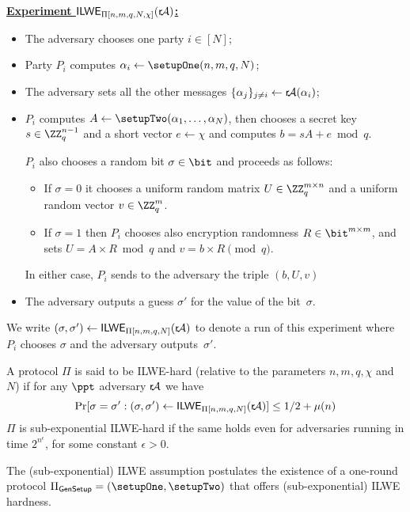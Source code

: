 \smallskip\noindent
\underline{\textbf{Experiment $\mathsf{ILWE}_{\Pi[n,m,q,N,\chi]}({\sf r}\!{\cal A})$:}}
\vspace{-1ex}
\begin{itemize}
\item
  The adversary chooses one party $i\in [N]$;
\item
  Party $P_i$ computes $\alpha_i\gets\setupOne(n,m,q,N)$;
\item
  The adversary sets all the other messages $\{\alpha_j\}_{j\ne i}\gets {\sf r}\!{\cal A}(\alpha_i)$;
\item
  $P_i$ computes $A\gets \setupTwo(\alpha_1,\ldots,\alpha_N)$, then chooses a secret key $s\in \ZZ_q^{n-1}$ and a short vector $e\gets\chi$ and computes $b=sA+e\bmod{q}$.

  $P_i$ also chooses a random bit $\sigma\in\bit$ and proceeds as follows:
  \begin{itemize}
  \item If $\sigma=0$ it chooses a uniform random matrix $U\in\ZZ_q^{m\times n}$ and a uniform random vector $v\in\ZZ_q^m$.

  \item If $\sigma=1$ then $P_i$ chooses also encryption randomness $R\in\bit^{m\times m}$, and sets $U = A\times R \bmod{q}$ and $v=b\times R \pmod{q}$.
  \end{itemize}
  In either case, $P_i$ sends to the adversary the triple $(b,U,v)$ 
\item
  The adversary outputs a guess $\sigma'$ for the value of the bit~$\sigma$.
\end{itemize}
We write $(\sigma,\sigma')\gets \mathsf{ILWE}_{\Pi[n,m,q,N]}({\sf r}\!{\cal A})$ to denote a run of this experiment where $P_i$ chooses $\sigma$ and the adversary outputs~$\sigma'$.

\begin{definition}\label{def:iLWE}
  A protocol $\Pi$ is said to be ILWE-hard (relative to the parameters $n,m,q,\chi$ and~$N$) if for any $\ppt$ adversary ${\sf r}\!{\cal A}$ we have
  \[
  \Pr[\sigma=\sigma' : (\sigma,\sigma')\gets \mathsf{ILWE}_{\Pi[n,m,q,N]}({\sf r}\!{\cal A})]
  \le 1/2 + \mu(n)
  \]
  $\Pi$ is sub-exponential ILWE-hard if the same holds even for adversaries running in time $2^{n^\epsilon}$, for some constant $\epsilon>0$.

The (sub-exponential) ILWE assumption postulates the existence of a one-round protocol $\Pi_{\sf{GenSetup}}=(\setupOne,\setupTwo)$ that offers (sub-exponential) ILWE hardness.
\end{definition}

